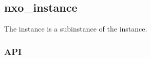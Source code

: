 %
%
%
%
%              

\subsection{nxo\_instance}
\label{nxo_instance}

The  instance is a subinstance of the 
instance.

\subsubsection{API}
